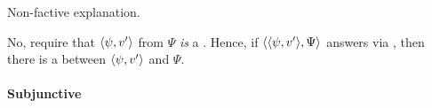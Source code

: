 \begin{note}
  Non-factive explanation.

  No,  require that \(\langle \psi, v' \rangle\) from \(\Psi\) \emph{is} a \fc{}.
  Hence, if \(\langle \langle \psi, v' \rangle, \Psi \rangle\) answers \qWhyV{} via \requ{}, then there is a \ros{} between \(\langle \psi, v' \rangle\) and \(\Psi\).
\end{note}

\paragraph{Subjunctive}














